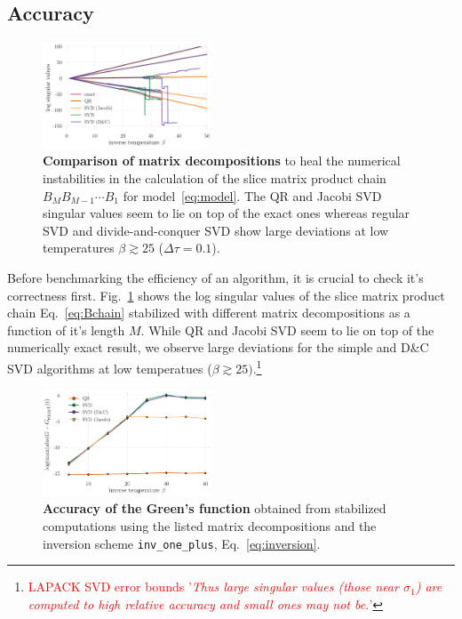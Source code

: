 \documentclass[%
 reprint,
superscriptaddress,
citeautoscript,
showpacs,
 amsmath,amssymb,
 aps,
 prb,
longbibliography,
]{revtex4-1}
\begin{document}
\subsection{Accuracy}

\begin{figure}
	\includegraphics[width=0.45\textwidth]{figures/decomp_comparison_simple.pdf}
	\caption{\textbf{Comparison of matrix decompositions} to heal the numerical instabilities in the calculation of the slice matrix product chain $B_M B_{M-1} \cdots B_1$ for model~\eqref{eq:model}. The QR and Jacobi SVD singular values seem to lie on top of the exact ones whereas regular SVD and divide-and-conquer SVD show large deviations at low temperatures $\beta \gtrsim 25$ ($\Delta \tau = 0.1$). \label{fig:decomp_comparison_simple}}
\end{figure}

Before benchmarking the efficiency of an algorithm, it is crucial to check it's correctness first. Fig.~\ref{fig:decomp_comparison_simple} shows the log singular values of the slice matrix product chain Eq.~\ref{eq:Bchain} stabilized with different matrix decompositions as a function of it's length $M$. While QR and Jacobi SVD seem to lie on top of the numerically exact result, we observe large deviations for the simple and D\&C SVD algorithms at low temperatues ($\beta \gtrsim 25)$.\footnote{\textcolor{red}{LAPACK SVD error bounds\cite{errorbounds} '\textit{Thus large singular values (those near $\sigma_1$) are computed to high relative accuracy and small ones may not be.}'}}\\

\begin{figure}[t]
	\includegraphics[width=0.45\textwidth]{figures/accuracy_greens_svd_regularinv.pdf}
	\caption{\textbf{Accuracy of the Green's function} obtained from stabilized computations using the listed matrix decompositions and the inversion scheme \texttt{inv\_one\_plus}, Eq.~\eqref{eq:inversion}. \label{fig:greens_accuracy_regularinv}}
\end{figure}
\end{document}
